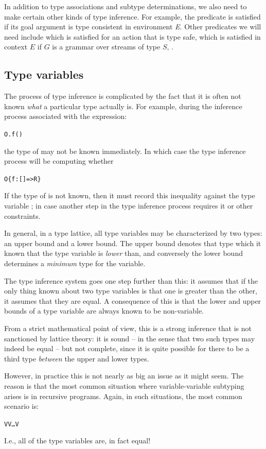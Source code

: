 In addition to type associations and subtype determinations, we also need to make certain other kinds of type inference. For example, the  predicate is satisfied if its goal argument is type consistent in environment \emph{E}. Other predicates we will need include  which is satisfied for an action that is type safe,  which is satisfied in context $E$ if $G$ is a grammar over streams of type $S$, .

\subsection{Type variables}
The process of type inference is complicated by the fact that it is often not known \emph{what} a particular type actually is. For example, during the inference process associated with the expression:
\begin{alltt}
O.f()
\end{alltt}
the type of  may not be known immediately. In which case the type inference process will be computing whether
\begin{alltt}
O \impl \{ f:[]=>R \}
\end{alltt}
If the type of  is not known, then it must record this inequality against the type variable ; in case another step in the type inference process requires it or other constraints.

In general, in a type lattice, all type variables may be characterized by two types: an upper bound and a lower bound. The upper bound denotes that type which it known that the type variable is \emph{lower} than, and conversely the lower bound determines a \emph{minimum} type for the variable.

The type inference system goes one step further than this: it assumes that if the only thing known about two type variables is that one is greater than the other, it assumes that they are equal. A consequence of this is that the lower and upper bounds of a type variable are always known to be non-variable.

From a strict mathematical point of view, this is a strong inference that is not sanctioned by lattice theory: it is sound -- in the sense that two such types may indeed be equal -- but not complete, since it is quite possible for there to be a third type \emph{between} the upper and lower types.

However, in practice this is not nearly as big an issue as it might seem. The reason is that the most common situation where variable-variable subtyping arises is in recursive programs. Again, in such situations, the most common scenario is:
\begin{alltt}
V \impl V \impl \ldots V
\end{alltt}
I.e., all of the type variables are, in fact equal!

